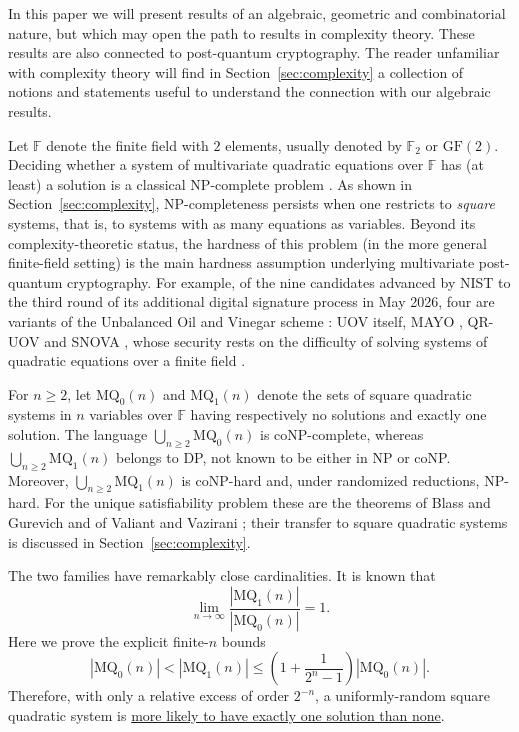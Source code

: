 \documentclass[11pt,a4paper]{article}
\theoremstyle{definition}
\newcommand{\MQ}{\mathrm{MQ}}
\newcommand{\FF}{\mathbb{F}}
\begin{document}
In this paper we will present results of an algebraic, geometric and combinatorial nature,
but which may open the path to results in complexity theory. These results are also connected to post-quantum cryptography.
The reader unfamiliar with complexity theory will find in Section~\ref{sec:complexity} a collection of notions and statements useful to understand the connection with our algebraic results.

Let $\FF$ denote the finite field with $2$ elements, usually denoted
by $\FF_2$ or $\mathrm{GF}(2)$.
Deciding whether a system of multivariate quadratic equations over
$\FF$ has (at least) a solution is a classical NP-complete problem
\cite{fraenkelyesha,gareyjohnson}. As shown in Section~\ref{sec:complexity}, NP-completeness persists when one restricts to
\emph{square} systems, that is, to systems with as many equations as variables.
Beyond its complexity-theoretic status, the hardness of this problem (in the more general finite-field setting) is the main hardness assumption underlying
multivariate post-quantum cryptography. For example, of the nine candidates advanced by NIST to
the third round of its additional digital signature process in May 2026, four are variants of the Unbalanced Oil and Vinegar scheme \cite{uov}: UOV itself, MAYO \cite{mayo}, QR-UOV \cite{qruov} and SNOVA \cite{snova}, whose security rests on the difficulty of solving systems of quadratic equations over a finite field
\cite{nistir8610}. 

For $n\ge2$, let $\MQ_0(n)$ and $\MQ_1(n)$ denote the sets of square
quadratic systems in $n$ variables over $\FF$ having respectively
no solutions and exactly one solution. The language
$
\bigcup_{n\ge2}\MQ_0(n)
$
is coNP-complete, whereas
$\bigcup_{n\ge2}\MQ_1(n)$
belongs to DP, not known to be either in NP or coNP. 
Moreover, $\bigcup_{n\ge2}\MQ_1(n)$ is coNP-hard and, under randomized
reductions, NP-hard. For the unique satisfiability problem these are the theorems of Blass and Gurevich \cite{blassgurevich} and of Valiant
and Vazirani \cite{valiantvazirani}; their transfer to square quadratic systems is discussed in Section~\ref{sec:complexity}.

The
two families have remarkably close cardinalities. It is known
\cite{fuscobach} that
\[
\lim_{n\to\infty}
\frac{|\MQ_1(n)|}{|\MQ_0(n)|}=1.
\]
Here we prove the explicit finite-$n$ bounds
\begin{equation}\label{eq:intro-mq}
|\MQ_0(n)|<|\MQ_1(n)|
\le
\left(1+\frac{1}{2^n-1}\right)|\MQ_0(n)|.
\end{equation}
Therefore, with only a relative excess of order $2^{-n}$, a
uniformly-random square quadratic system is 
\underline{more likely to have exactly
one solution than none}.\\
\end{document}
